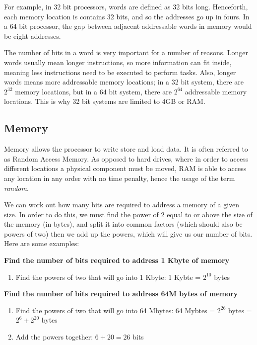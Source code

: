 \documentclass{article}
\begin{document}

For example, in 32 bit processors, words are defined as 32 bits long.
Henceforth, each memory location is contains 32 bits, and so the addresses go up
in fours. In a 64 bit processor, the gap between adjacent addressable words in
memory would be eight addresses.

The number of bits in a word is very important for a number of reasons. Longer
words usually mean longer instructions, so more information can fit inside,
meaning less instructions need to be executed to perform tasks. Also, longer
words means more addressable memory locations; in a 32 bit system, there are
$2^32$ memory locations, but in a 64 bit system, there are $2^64$ addressable
memory locations. This is why 32 bit systems are limited to 4GB or RAM.

\subsection{Memory}

Memory allows the processor to write store and load data. It is often referred
to as Random Access Memory. As opposed to hard drives, where in order to access
different locations a physical component must be moved, RAM is able to access
any location in any order with no time penalty, hence the usage of the term {\it
random}.

We can work out how many bits are required to address a memory of a given size.
In order to do this, we must find the power of 2 equal to or above the size of
the memory (in bytes), and split it into common factors (which should also be
powers of two) then we add up the powers, which will give us our number of bits.
Here are some examples:

{\bf Find the number of bits required to address 1 Kbyte of memory}

\begin{enumerate}
	\item Find the powers of two that will go into 1 Kbyte:
			1 Kybte = $2^{10}$ bytes
\end{enumerate}

{\bf Find the number of bits required to address 64M bytes of memory}

\begin{enumerate}
	\item Find the powers of two that will go into 64 Mbytes:
			64 Mybtes = $2^{26}$ bytes = $2^6 + 2^{20}$ bytes
	\item Add the powers together:
			$6 + 20 = 26$ bits
\end{enumerate}
\end{document}
